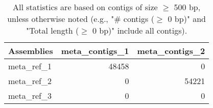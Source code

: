 \documentclass[12pt,a4paper]{article}
\begin{document}
\begin{table}[ht]
\begin{center}
\caption{All statistics are based on contigs of size $\geq$ 500 bp, unless otherwise noted (e.g., "\# contigs ($\geq$ 0 bp)" and "Total length ($\geq$ 0 bp)" include all contigs).}
\begin{tabular}{|l*{2}{|r}|}
\hline
Assemblies & meta\_contigs\_1 & meta\_contigs\_2 \\ \hline
meta\_ref\_1 & 48458 & 0 \\ \hline
meta\_ref\_2 & 0 & 54221 \\ \hline
meta\_ref\_3 & 0 & 0 \\ \hline
\end{tabular}
\end{center}
\end{table}
\end{document}
